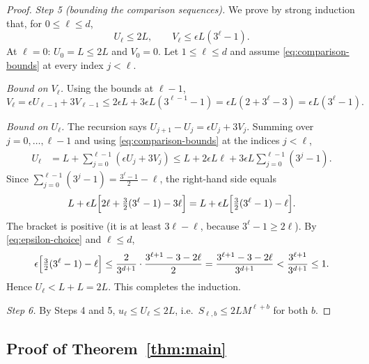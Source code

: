 \documentclass[11pt]{article}
\theoremstyle{definition}
\theoremstyle{remark}
\begin{document}
\begin{proof}
\emph{Step 5 (bounding the comparison sequences).} We prove by strong
induction that, for \(0\leq\ell\leq d\),
\begin{equation}
\label{eq:comparison-bounds}
 U_\ell\leq2L,
 \qquad
 V_\ell\leq\epsilon L(3^\ell-1).
\end{equation}
At \(\ell=0\): \(U_0=L\le 2L\) and \(V_0=0\). Let \(1\leq\ell\leq d\) and
assume \eqref{eq:comparison-bounds} at every index \(j<\ell\).

\emph{Bound on \(V_\ell\).} Using the bounds at \(\ell-1\),
\[
 V_\ell=\epsilon U_{\ell-1}+3V_{\ell-1}
 \leq 2\epsilon L+3\epsilon L(3^{\ell-1}-1)
 =\epsilon L(2+3^\ell-3)=\epsilon L(3^\ell-1).
\]

\emph{Bound on \(U_\ell\).} The recursion says
\(U_{j+1}-U_{j}=\epsilon U_{j}+3V_{j}\). Summing over \(j=0,\ldots,\ell-1\)
and using \eqref{eq:comparison-bounds} at the indices \(j<\ell\),
\begin{align*}
 U_\ell
 &=L+\sum_{j=0}^{\ell-1}(\epsilon U_j+3V_j)
 \leq L+2\epsilon L\ell
          +3\epsilon L\sum_{j=0}^{\ell-1}(3^j-1).
\end{align*}
Since \(\sum_{j=0}^{\ell-1}(3^j-1)=\frac{3^\ell-1}{2}-\ell\), the right-hand
side equals
\[
 L+\epsilon L\Bigl[2\ell+\tfrac32(3^\ell-1)-3\ell\Bigr]
 =L+\epsilon L\Bigl[\tfrac32(3^\ell-1)-\ell\Bigr].
\]
The bracket is positive (it is at least \(3\ell-\ell\), because
\(3^\ell-1\ge2\ell\)). By \eqref{eq:epsilon-choice} and \(\ell\le d\),
\[
 \epsilon\Bigl[\tfrac32(3^\ell-1)-\ell\Bigr]
 \leq\frac{2}{3^{d+1}}\cdot\frac{3^{\ell+1}-3-2\ell}{2}
 =\frac{3^{\ell+1}-3-2\ell}{3^{d+1}}
 <\frac{3^{\ell+1}}{3^{d+1}}\le1 .
\]
Hence \(U_\ell<L+L=2L\). This completes the induction.

\emph{Step 6.} By Steps 4 and 5, \(u_\ell\le U_\ell\leq2L\), i.e.\
\(S_{\ell,b}\le 2LM^{\ell+b}\) for both \(b\).
\end{proof}

\subsection{Proof of Theorem~\ref{thm:main}}
\end{document}
